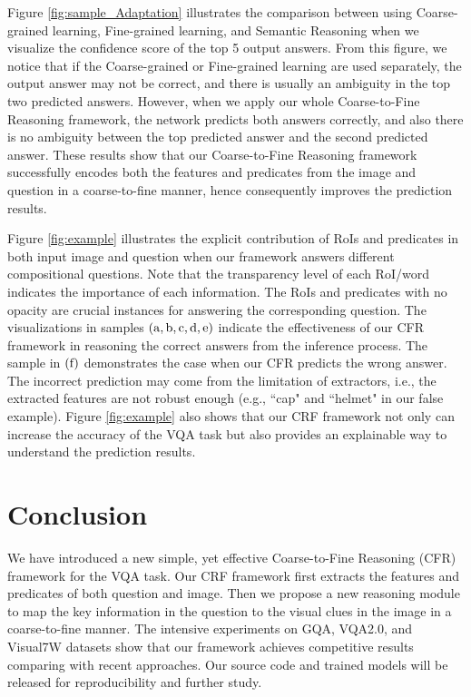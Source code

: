 \documentclass[10pt,twocolumn,letterpaper]{article}
\begin{document}
Figure \ref{fig:sample_Adaptation} illustrates the comparison between using Coarse-grained learning, Fine-grained learning, and Semantic Reasoning when we visualize the confidence score of the top 5 output answers. From this figure, we notice that if the Coarse-grained or Fine-grained learning are used separately, the output answer may not be correct, and there is usually an ambiguity in the top two predicted answers. However, when we apply our whole Coarse-to-Fine Reasoning framework, the network predicts both answers correctly, and also there is no ambiguity between the top predicted answer and the second predicted answer. These results show that our Coarse-to-Fine Reasoning framework successfully encodes both the features and predicates from the image and question in a coarse-to-fine manner, hence consequently improves the prediction results.


Figure \ref{fig:example} illustrates the explicit contribution of RoIs and predicates in both input image and question when our framework answers different compositional questions. Note that the transparency level of each RoI/word indicates the importance of each information. The RoIs and predicates with no opacity are crucial instances for answering the corresponding question. The visualizations in samples $\rm (a,b,c,d,e)$ indicate the effectiveness of our CFR framework in reasoning the correct answers from the inference process. The sample in $\rm (f)$ demonstrates the case when our CFR predicts the wrong answer. The incorrect prediction may come from the limitation of extractors, i.e., the extracted features are not robust enough (e.g., ``cap" and ``helmet" in our false example). Figure \ref{fig:example} also shows that our CRF framework not only can increase the accuracy of the VQA task but also provides an explainable way to understand the prediction results.








\section{Conclusion}
\label{sec:con}
We have introduced a new simple, yet effective Coarse-to-Fine Reasoning (CFR) framework for the VQA task. Our CRF framework first extracts the features and predicates of both question and image. Then we propose a new reasoning module to map the key information in the question to the visual clues in the image in a coarse-to-fine manner. The intensive experiments on GQA, VQA2.0, and Visual7W datasets show that our framework achieves competitive results comparing with recent approaches. Our source code and trained models will be released for reproducibility and further study.

{\small


}
\end{document}
